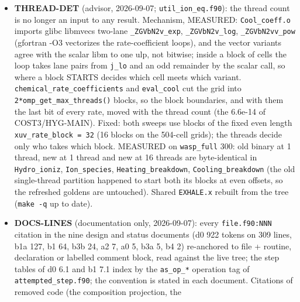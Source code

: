 \documentclass[english,a4paper]{my_memo}
\begin{document}
\begin{itemize}
  now carry all 19 deposit channels of \texttt{heat\_channel\_name} with the
  descriptive brackets stripped the way \texttt{\_clean\_name} strips them
  (\texttt{heat\_He23S\_assoc}, the two Lyman-Werner halves, \texttt{heat\_mol\_chem},
  \texttt{heat\_FUV\_photolysis}, \texttt{heat\_oxygen\_collisional}, the two CO channels);
  the panel loop already skips a channel a run\textquotesingle s file lacks. Both scripts
  parse; the loader reads the file header, so the fallback list was never
  what a real file was read by.
\item
  \textbf{THREAD-DET} (advisor, 2026-09-07; \texttt{util\_ion\_eq.f90}): the thread count
  is no longer an input to any result. Mechanism, MEASURED: \texttt{Cool\_coeff.o}
  imports glibc libmvec\textquotesingle s two-lane \texttt{\_ZGVbN2v\_exp}, \texttt{\_ZGVbN2v\_log},
  \texttt{\_ZGVbN2vv\_pow} (gfortran -O3 vectorizes the rate-coefficient loops), and
  the vector variants agree with the scalar libm to one ulp, not bitwise;
  inside a block of cells the loop takes lane pairs from \texttt{j\_lo} and an odd
  remainder by the scalar call, so where a block STARTS decides which cell
  meets which variant. \texttt{chemical\_rate\_coefficients} and \texttt{eval\_cool} cut the
  grid into \texttt{2*omp\_get\_max\_threads()} blocks, so the block boundaries, and
  with them the last bit of every rate, moved with the thread count (the
  6.6e-14 of COST3/HYG-MAIN). Fixed: both sweeps use blocks of the fixed
  even length \texttt{xuv\_rate\_block\ =\ 32} (16 blocks on the 504-cell grids); the
  threads decide only who takes which block. MEASURED on \texttt{wasp\_full} 300:
  old binary at 1 thread, new at 1 thread and new at 16 threads are
  byte-identical in \texttt{Hydro\_ioniz}, \texttt{Ion\_species}, \texttt{Heating\_breakdown},
  \texttt{Cooling\_breakdown} (the old single-thread partition happened to start
  both its blocks at even offsets, so the refreshed goldens are untouched).
  Shared \texttt{EXHALE.x} rebuilt from the tree (\texttt{make\ -q} up to date).
\item
  \textbf{DOCS-LINES} (documentation only, 2026-09-07): every \texttt{file.f90:NNN}
  citation in the nine design and status documents (d0 922 tokens on 309
  lines, b1a 127, b1 64, b3b 24, a2 7, a0 5, b3a 5, b4 2) re-anchored to
  file + routine, declaration or labelled comment block, read against the
  live tree; the step tables of d0 6.1 and b1 7.1 index by the \texttt{as\_op\_*}
  operation tag of \texttt{attempted\_step.f90}; the convention is stated in each
  document. Citations of removed code (the composition projection, the

\end{itemize}
\end{document}
